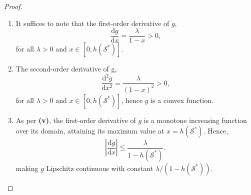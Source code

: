 \documentclass[10pt,a4paper]{amsart}
\def\lp{\left(}
\def\rp{\right)}
\def\sS{\mathcal{S}}
\def\sT{\mathcal{T}}
\begin{document}
\begin{proof}
\begin{enumerate}[label=\bfseries(\roman*), leftmargin=*, itemsep=2pt]
\begin{equation}
\exp\lp \frac{-f_i(\sS)}{\lambda} \rp \geq \exp\lp \frac{-f_i(\mathcal{T})}{\lambda} \rp.
\end{equation}
Both of these quantities are nonnegative. Then, multiplying the left-hand side of \eqref{eq:multiplythis} by $\exp(-f_i(\sS)/\lambda)$ and the right-hand side by $\exp(-f_i(\mathcal{T})/\lambda)$ preserves the inequality, and we obtain
\begin{equation}
\begin{split}
\exp\lp \frac{-f_i(\sS)}{\lambda} \rp - \exp\lp \frac{-f_i(\sS \cup \{e\})}{\lambda} \rp  \geq \exp\lp \frac{-f_i(\mathcal{T})}{\lambda} \rp - \exp\lp \frac{-f_i(\sT \cup \{e\})}{\lambda} \rp.
\end{split}
\end{equation}
This demonstrates that the set function $\sS \mapsto -\exp (-f_i(\sS)/\lambda)$ is submodular for all $i \in [n]$. The addition of the constant $1$, multiplication with the nonnegative $Q_i$ and the summation through the indices $i \in [n]$ preserve submodularity, hence,
\begin{equation}
h(\sS) = \sum_{i=1}^n Q_i \lp 1 - \exp\lp \dfrac{-f_i (\sS)}{\lambda}\rp\rp
\end{equation}
is submodular.
\item It suffices to note that the first-order derivative of $g$,
\begin{equation}
\dfrac{\mathrm{d}g}{\mathrm{d}x} = \dfrac{\lambda}{1-x} > 0,
\end{equation}
for all $\lambda >0$ and $x \in [0, h(\sS^\ast)]$. 
\item The second-order derivative of g,
\begin{equation}
\dfrac{\mathrm{d}^2g}{\mathrm{d}x^2} = \dfrac{\lambda}{(1-x)^2} > 0,
\end{equation}
for all $\lambda >0$ and $x \in [0, h(\sS^\ast)]$, hence $g$ is a convex function.
\item As per \textbf{(v)}, the first-order derivative of $g$ is a monotone increasing function over its domain, attaining its maximum value at $x = h(\sS^\ast)$. Hence, 
\begin{equation}
\left\lvert\dfrac{\mathrm{d}g}{\mathrm{d}x}\right\rvert \leq \dfrac{\lambda}{1-h(\sS^\ast)},
\end{equation}
making $g$ Lipschitz continuous with constant $\lambda/(1-h(\sS^\ast))$.
\end{enumerate}
\end{proof}
\end{document}
